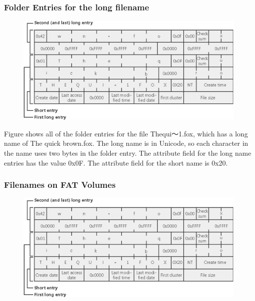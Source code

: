 % 
\begin{frame}[fragile]
    \frametitle{Folder Entries for the long filename}
\begin{figure}
    \includegraphics[width=0.6\linewidth]{figs/FAT-filename.png}
    \end{figure}

    Figure shows all of the folder entries for the file {\color{red}Thequi～1.fox}, which has a long name of {\color{red}The quick brown.fox}. The long name is in Unicode, so each character in the name uses two bytes in the folder entry. The {\color{red}attribute field} for the long name entries has the value {\color{red}0x0F}. The attribute field for the short name is {\color{red}0x20}.
\end{frame}
% 
% 
\begin{frame}[fragile]
    \frametitle{Filenames on FAT Volumes}
    \begin{figure}
  \includegraphics[width=0.8\linewidth]{figs/FAT-filename.png}
  \end{figure}
\end{frame}
% 

